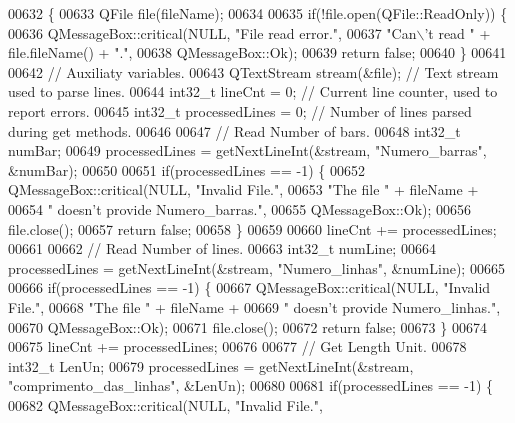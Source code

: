 \begin{DoxyCode}
00632 \{
00633   QFile file(fileName);
00634 
00635   \textcolor{keywordflow}{if}(!file.open(QFile::ReadOnly)) \{
00636     QMessageBox::critical(NULL, \textcolor{stringliteral}{"File read error."},
00637                           \textcolor{stringliteral}{"Can\(\backslash\)'t read "} + file.fileName() + \textcolor{stringliteral}{"."},
00638                           QMessageBox::Ok);
00639     \textcolor{keywordflow}{return} \textcolor{keyword}{false};
00640   \}
00641 
00642   \textcolor{comment}{// Auxiliaty variables.}
00643   QTextStream stream(&file); \textcolor{comment}{// Text stream used to parse lines.}
00644   int32\_t lineCnt = 0; \textcolor{comment}{// Current line counter, used to report errors.}
00645   int32\_t processedLines = 0; \textcolor{comment}{// Number of lines parsed during get methods.}
00646 
00647   \textcolor{comment}{// Read Number of bars.}
00648   int32\_t numBar;
00649   processedLines = getNextLineInt(&stream, \textcolor{stringliteral}{"Numero\_barras"}, &numBar);
00650 
00651   \textcolor{keywordflow}{if}(processedLines == -1) \{
00652     QMessageBox::critical(NULL, \textcolor{stringliteral}{"Invalid File."},
00653                           \textcolor{stringliteral}{"The file "} + fileName +
00654                           \textcolor{stringliteral}{" doesn't provide Numero\_barras."},
00655                           QMessageBox::Ok);
00656     file.close();
00657     \textcolor{keywordflow}{return} \textcolor{keyword}{false};
00658   \}
00659 
00660   lineCnt += processedLines;
00661 
00662   \textcolor{comment}{// Read Number of lines.}
00663   int32\_t numLine;
00664   processedLines = getNextLineInt(&stream, \textcolor{stringliteral}{"Numero\_linhas"}, &numLine);
00665 
00666   \textcolor{keywordflow}{if}(processedLines == -1) \{
00667     QMessageBox::critical(NULL, \textcolor{stringliteral}{"Invalid File."},
00668                           \textcolor{stringliteral}{"The file "} + fileName +
00669                           \textcolor{stringliteral}{" doesn't provide Numero\_linhas."},
00670                           QMessageBox::Ok);
00671     file.close();
00672     \textcolor{keywordflow}{return} \textcolor{keyword}{false};
00673   \}
00674 
00675   lineCnt += processedLines;
00676 
00677   \textcolor{comment}{// Get Length Unit.}
00678   int32\_t LenUn;
00679   processedLines = getNextLineInt(&stream, \textcolor{stringliteral}{"comprimento\_das\_linhas"}, &LenUn);
00680 
00681   \textcolor{keywordflow}{if}(processedLines == -1) \{
00682     QMessageBox::critical(NULL, \textcolor{stringliteral}{"Invalid File."},

\end{DoxyCode}
